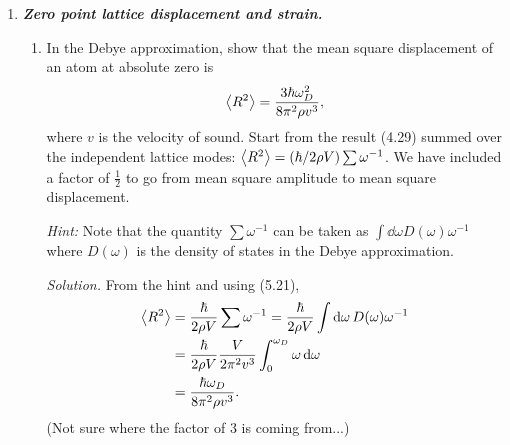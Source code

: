 \documentclass{homework}
\newcommand{\solution}{	\vspace{1em} \textit{Solution.} \quad }
\begin{document}
\begin{enumerate}
\begin{enumerate}
				\solution From the dispersion relation above, $$ K(\omega) =  \sqrt{ \frac{1}{A}\left( \omega_0 - \omega \right) }.$$
				The density is given by (35) \begin{align*}
					D(\omega) \dd{\omega} & = \left(\frac{L}{2 \pi}\right)^3 \underbrace{ \int_\mathrm{shell} \dd[3]{K}}_{V(K)} \\
					D(\omega) \dd{\omega} & = \left(\frac{L}{2 \pi}\right)^3 \left(\frac{4}{3} \pi K^3\right) \\
						& = (L/2\pi)^3 (2 \pi / A^{3/2}) (2/3) \left(\omega_0 - \omega\right)^{3/2} \\
					\intertext{Integrating, we seem to be getting an extra multiple of $1/3$ (as part of the $2/3$), but is otherwise right,}
					\implies D(\omega) & = (L/2 \pi)^3 (2 \pi / 3A^{3/2}) (\omega_0 - \omega)^{1/2}. \qed
				\end{align*}
			\end{enumerate}
		
		\pagebreak
		
		\item %
			\textbf{\textit{Zero point lattice displacement and strain.}} \begin{enumerate}
				\item In the Debye approximation, show that the mean square displacement of an atom at absolute zero is $$\expval{R^2} = \frac{3 \hbar \omega_D^2}{8 \pi^2 \rho v^3},$$
				where $v$ is the velocity of sound. Start from the result (4.29) summed over the independent lattice modes: $\expval{R^2}=(\hbar / 2 \rho V) \sum \omega^{-1}$. We have included a factor of $\frac{1}{2}$ to go from mean square amplitude to mean square displacement. 
				
				\textit{Hint:} Note that the quantity $\sum \omega^{-1}$ can be taken as $\int \dd{\omega} D(\omega) \omega^{-1}$ where $D(\omega)$ is the density of states in the Debye approximation.
				
				
				\solution From the hint and using (5.21), \begin{align*}
					\expval{R^2} & = \frac{\hbar}{2 \rho V} \sum \omega^{-1} = \frac{\hbar}{2 \rho V} \int \dd{\omega} D(\omega) \omega^{-1} \\
						& = \frac{\hbar}{2 \rho V} \frac{V}{2 \pi^2 v^3} \int_0^{\omega_D} \omega \dd{\omega} \\
						& = \frac{\hbar \omega_D}{8 \pi^2 \rho v^3}.
				\end{align*}
				(Not sure where the factor of $3$ is coming from...)
								

\end{enumerate}
\end{enumerate}
\end{document}
